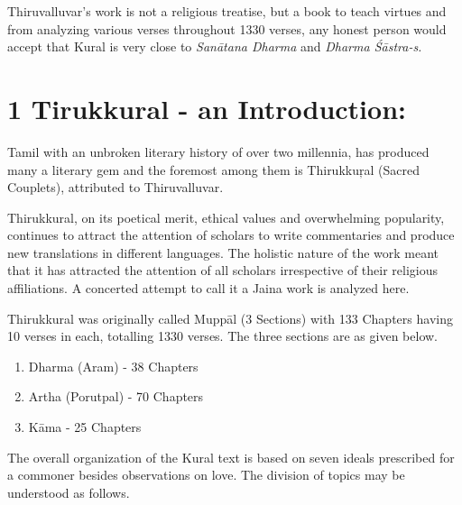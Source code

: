 Thiruvalluvar’s work is not a religious treatise, but a book to teach virtues and from analyzing various verses throughout 1330 verses, any honest person would accept that Kural is very close to \textit{Sanātana Dharma} and \textit{Dharma Śāstra-s.}


\section*{1 Tirukkural - an Introduction:}

Tamil with an unbroken literary history of over two millennia, has produced many a literary gem and the foremost among them is Thirukkuŗal (Sacred Couplets), attributed to Thiruvalluvar.

Thirukkural, on its poetical merit, ethical values and overwhelming popularity, continues to attract the attention of scholars to write commentaries and produce new translations in different languages. The holistic nature of the work meant that it has attracted the attention of all scholars irrespective of their religious affiliations. A concerted attempt to call it a Jaina work is analyzed here.

Thirukkural was originally called Muppāl (3 Sections) with 133 Chapters having 10 verses in each, totalling 1330 verses. The three sections are as given below.

\begin{enumerate}[{\rm 1)}]
\itemsep=0pt
\item Dharma (Aram) - 38 Chapters

 \item Artha (Porutpal) - 70 Chapters

 \item Kāma - 25 Chapters

\end{enumerate}

\newpage

The overall organization of the Kural text is based on seven ideals prescribed for a commoner besides observations on love. The division of topics may be understood as follows.

